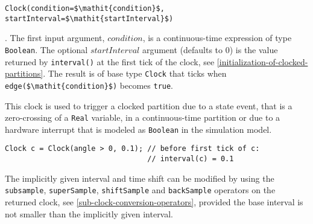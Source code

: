 \begin{operatordefinition*}[Clock]\label{modelica:clock-event}
\begin{synopsis}\begin{lstlisting}
Clock(condition=$\mathit{condition}$, startInterval=$\mathit{startInterval}$)
\end{lstlisting}\end{synopsis}
\begin{semantics}
.
The first input argument, $\mathit{condition}$, is a continuous-time expression of type \lstinline!Boolean!.
The optional $\mathit{startInterval}$ argument (defaults to 0) is the value returned by \lstinline!interval()! at the first tick of the clock, see \cref{initialization-of-clocked-partitions}.
The result is of base type \lstinline!Clock! that ticks when \lstinline!edge($\mathit{condition}$)! becomes \lstinline!true!.
\begin{nonnormative}
This clock is used to trigger a clocked partition due to a state event, that is a zero-crossing of a \lstinline!Real! variable, in a continuous-time partition or due to a hardware interrupt that is modeled as \lstinline!Boolean! in the simulation model.
\end{nonnormative}

\begin{example}
\begin{lstlisting}[language=modelica]
Clock c = Clock(angle > 0, 0.1); // before first tick of c:
                                 // interval(c) = 0.1
\end{lstlisting}
\end{example}

\begin{nonnormative}
The implicitly given interval and time shift can be modified by using the \lstinline!subsample!, \lstinline!superSample!, \lstinline!shiftSample! and \lstinline!backSample! operators on the returned clock, see \cref{sub-clock-conversion-operators}, provided the base interval is not smaller than the implicitly given interval.
\end{nonnormative}
\end{semantics}
\end{operatordefinition*}

